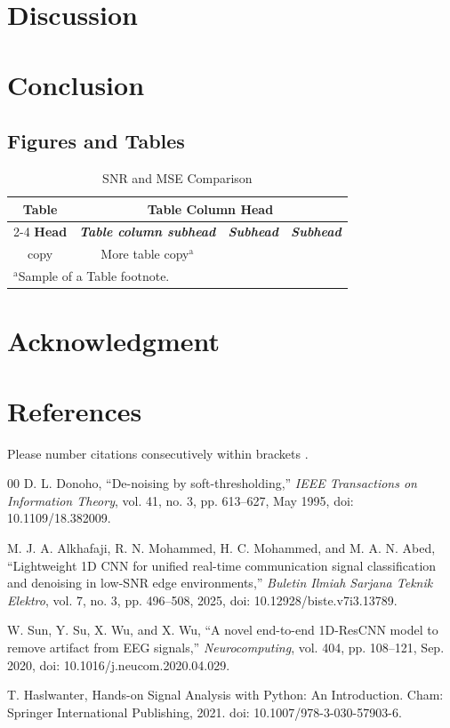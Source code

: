 \documentclass[conference]{IEEEtran}
\begin{document}
\section{Discussion}
\section{Conclusion}

\subsection{Figures and Tables}


\begin{table}[htbp]
\caption{SNR and MSE Comparison}
\begin{center}
\begin{tabular}{|c|c|c|c|}
\hline
\textbf{Table}&\multicolumn{3}{|c|}{\textbf{Table Column Head}} \\
\cline{2-4} 
\textbf{Head} & \textbf{\textit{Table column subhead}}& \textbf{\textit{Subhead}}& \textbf{\textit{Subhead}} \\
\hline
copy& More table copy$^{\mathrm{a}}$& &  \\
\hline
\multicolumn{4}{l}{$^{\mathrm{a}}$Sample of a Table footnote.}
\end{tabular}
\label{tab1}
\end{center}
\end{table}




\section*{Acknowledgment}


\section*{References}

Please number citations consecutively within brackets \cite{b1}.


\begin{thebibliography}{00}  D. L. Donoho, ``De-noising by soft-thresholding,'' \textit{IEEE Transactions on Information Theory}, vol. 41, no. 3, pp. 613--627, May 1995, doi: 10.1109/18.382009. 

 M. J. A. Alkhafaji, R. N. Mohammed, H. C. Mohammed, and M. A. N. Abed, ``Lightweight 1D CNN for unified real-time communication signal classification and denoising in low-SNR edge environments,'' \textit{Buletin Ilmiah Sarjana Teknik Elektro}, vol. 7, no. 3, pp. 496--508, 2025, doi: 10.12928/biste.v7i3.13789. 

 W. Sun, Y. Su, X. Wu, and X. Wu, ``A novel end-to-end 1D-ResCNN model to remove artifact from EEG signals,'' \textit{Neurocomputing}, vol. 404, pp. 108--121, Sep. 2020, doi: 10.1016/j.neucom.2020.04.029. 

 T. Haslwanter, Hands-on Signal Analysis with Python: An Introduction. Cham: Springer International Publishing, 2021. doi: 10.1007/978-3-030-57903-6.


\end{thebibliography}
\end{document}
